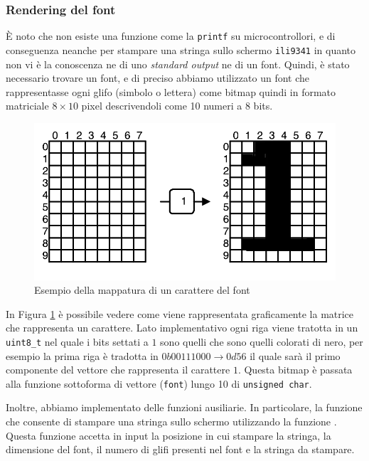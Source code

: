 \documentclass[a4paper]{article}
\begin{document}
\subsubsection{Rendering del font}

È noto che non esiste una funzione come la \texttt{printf} su microcontrollori, e di conseguenza neanche per stampare una stringa sullo schermo \texttt{ili9341} in quanto non vi è la conoscenza ne di uno \textit{standard output} ne di un font. Quindi, è stato necessario trovare un font, e di preciso abbiamo utilizzato un font che rappresentasse ogni glifo (simbolo o lettera) come bitmap quindi in formato matriciale $8 \times 10$ pixel descrivendoli come 10 numeri a 8 bits.

\begin{figure}[h!t]
    \begin{center}
        \includegraphics[scale=0.5]{./figures/matrix_font.pdf}
    \end{center}
    \caption{Esempio della mappatura di un carattere del font}
    \label{fig:matrix_font}
\end{figure}

In Figura \ref{fig:matrix_font} è possibile vedere come viene rappresentata graficamente la matrice che rappresenta un carattere. Lato implementativo ogni riga viene tratotta in un \texttt{uint8\_t} nel quale i bits settati a $1$ sono quelli che sono quelli colorati di nero, per esempio la prima riga è tradotta in $0b00111000 \rightarrow 0d56$ il quale sarà il primo componente del vettore che rappresenta il carattere $1$. Questa bitmap è passata alla funzione {} sottoforma di vettore (\texttt{font}) lungo 10 di \texttt{unsigned char}.

Inoltre, abbiamo implementato delle funzioni ausiliarie. In particolare, la funzione {} che consente di stampare una stringa sullo schermo utilizzando la funzione {}. Questa funzione accetta in input la posizione in cui stampare la stringa, la dimensione del font, il numero di glifi presenti nel font e la stringa da stampare.
\end{document}
